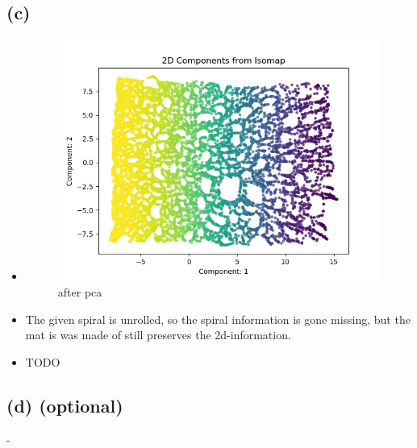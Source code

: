 \documentclass[a4paper]{article}
\begin{document}
\subsection*{(c)}
\begin{itemize}
	\item \begin{figure}[!ht]
		\centering
		\includegraphics[width=0.7\linewidth]{swiss_roll_result}
		\caption{after pca}
	\end{figure}
	\item The given spiral is unrolled, so the spiral information is gone missing, but the mat is was made of still preserves the 2d-information.
	\item TODO
\end{itemize}


\subsection*{(d) (optional)}
-
\end{document}
